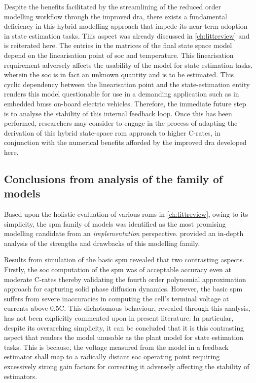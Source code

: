
Despite   the  benefits facilitated  by   the streamlining  of  the reduced 
order  modelling  workflow through  the  improved \gls{dra},  there  exists a 
fundamental  deficiency  in this  hybrid  modelling approach  that impede  its
near-term  adoption in  state estimation  tasks. This aspect was already
discussed in \cref{ch:littreview} and is reiterated here. The entries  in  the 
matrices  of  the  final  state  space  model  depend  on  the linearisation
point of \gls{soc} and temperature. This linearisation requirement adversely
affects the usability of the model for state estimation tasks, wherein the
\gls{soc} is in fact an unknown quantity and is to be estimated. This cyclic
dependency  between  the linearisation  point  and  the state-estimation  entity
renders this  model questionable for use  in a demanding application  such as in
embedded \glspl{bms} on-board electric vehicles. Therefore, the immediate future
step is to analyse  the stability of this internal feedback  loop. Once this has
been performed,  researchers may consider to  engage in the process  of adapting
the derivation of this hybrid  state-space \gls{rom} approach to higher C-rates,
in conjunction  with the numerical  benefits afforded by the  improved \gls{dra}
developed here.

\subsection{Conclusions from analysis of the  family of models}

Based    upon   the    holistic   evaluation    of   various    \glspl{rom}   in
\cref{ch:littreview},  owing   to  its  simplicity,  the   \gls{spm}  family  of
models  was  identified  as  the  most promising  modelling  candidate  from  an
\emph{implementation}  perspective.   provided an  in-depth
analysis of the strengths and drawbacks of this modelling family.

Results from  simulation of  the basic \gls{spm}  revealed that  two contrasting
aspects. Firstly, the  \gls{soc} computation of the \gls{spm}  was of acceptable
accuracy even at moderate C-rates thereby validating the fourth order polynomial
approximation approach  for capturing  solid phase diffusion  dynamics. However,
the basic  \gls{spm} suffers  from severe inaccuracies  in computing  the cell's
terminal voltage  at currents above  0.5C. This dichotomous  behaviour, revealed
through  this  analysis, has  not  been  explicitly  commented upon  in  present
literature.  In  particular,  despite  its overarching  simplicity,  it  can  be
concluded that it is this contrasting  aspect that renders the model unusable as
the  plant model  for  state  estimation tasks.  This  is  because, the  voltage
measured  from the  model  in a  feedback  estimator shall  map  to a  radically
distant \gls{soc} operating point requiring  excessively strong gain factors for
correcting it adversely affecting the stability of estimators.

